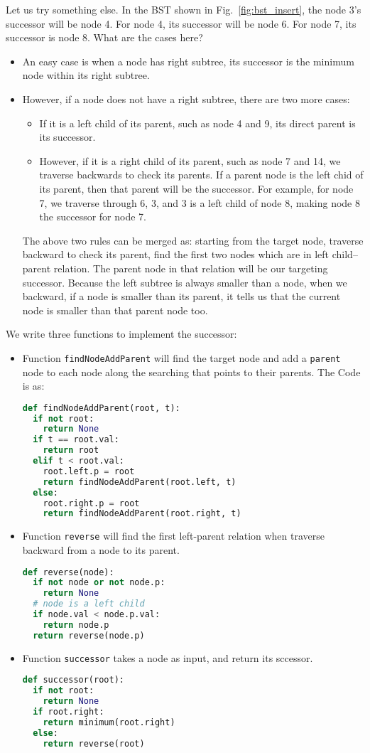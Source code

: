 \documentclass[main.tex]{subfiles}
\begin{document}
Let us try something else. In the BST shown in Fig.~\ref{fig:bst_insert}, the node 3's successor will be node 4. For node 4, its successor will be node 6. For node 7, its successor is node 8. What are the cases here?
\begin{itemize}
    \item An easy case is when a node has right subtree, its successor is the minimum node within its right subtree.
    \item However, if a node does not have a right subtree, there are two more cases: 
    \begin{itemize}
        \item If it is a left child of its parent, such as node 4 and 9, its direct parent is its successor.
        \item However, if it is a right child of its parent, such as node 7 and 14, we traverse backwards to check its parents. If a parent node is the left chid of its parent, then that parent will be the successor. For example, for node 7, we traverse through 6, 3, and 3 is a left child of node 8, making node 8 the successor for node 7.  
    \end{itemize}
    The above two rules can be merged as: starting from the target node, traverse backward to check its parent, find the first two  nodes which are in left child--parent relation. The parent node in that relation will be our targeting successor. Because the left subtree is always smaller than a node, when we backward, if a node is smaller than its parent, it tells us that the current node is smaller than that parent node too. 
\end{itemize}
We write three functions to implement the successor: 
\begin{itemize}
    \item Function \texttt{findNodeAddParent} will find the target node and add a \texttt{parent} node to each node along the searching that points to their parents. The Code is as:
\begin{lstlisting}[language=Python]
def findNodeAddParent(root, t):
  if not root:
    return None
  if t == root.val: 
    return root
  elif t < root.val:
    root.left.p = root
    return findNodeAddParent(root.left, t)
  else:
    root.right.p = root
    return findNodeAddParent(root.right, t)
\end{lstlisting}
\item Function \texttt{reverse} will find the first left-parent relation when traverse backward from a node to its parent.
\begin{lstlisting}[language=Python]
def reverse(node):
  if not node or not node.p:
    return None
  # node is a left child
  if node.val < node.p.val:
    return node.p
  return reverse(node.p)
\end{lstlisting}
\item Function \texttt{successor} takes a node as input, and return its sccessor.
\begin{lstlisting}[language=Python]
def successor(root):
  if not root:
    return None
  if root.right:
    return minimum(root.right)
  else:
    return reverse(root) 
\end{lstlisting}
\end{itemize}
\end{document}
